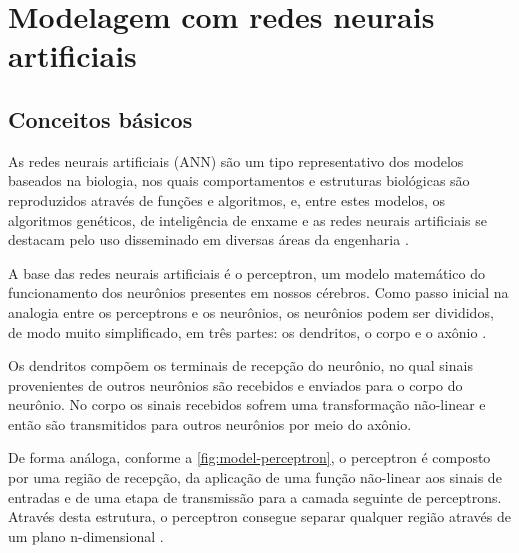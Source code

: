 \chapter{Modelagem com redes neurais artificiais} \label{cha:model}

\section{Conceitos básicos} \label{sec:model-basic}

As redes neurais artificiais (ANN) são um tipo representativo dos modelos baseados na biologia, nos quais comportamentos e estruturas biológicas são reproduzidos através de funções e algoritmos, e, entre estes modelos, os algoritmos genéticos, de inteligência de enxame e as redes neurais artificiais se destacam pelo uso disseminado em diversas áreas da engenharia \cite{Darwish2018} \cite{Fan2020}.

A base das redes neurais artificiais é o perceptron, um modelo matemático do funcionamento dos neurônios presentes em nossos cérebros. Como passo inicial na analogia entre os perceptrons e os neurônios, os neurônios podem ser divididos, de modo muito simplificado, em três partes: os dendritos, o corpo e o axônio \cite{hall_tratado_2011}.

Os dendritos compõem os terminais de recepção do neurônio, no qual sinais provenientes de outros neurônios são recebidos e enviados para o corpo do neurônio. No corpo os sinais recebidos sofrem uma transformação não-linear e então são transmitidos para outros neurônios por meio do axônio.

De forma análoga, conforme a \autoref{fig:model-perceptron}, o perceptron é composto por uma região de recepção, da aplicação de uma função não-linear aos sinais de entradas e de uma etapa de transmissão para a camada seguinte de perceptrons. Através desta estrutura, o perceptron consegue separar qualquer região através de um plano n-dimensional \cite{haykin1999neural}.


